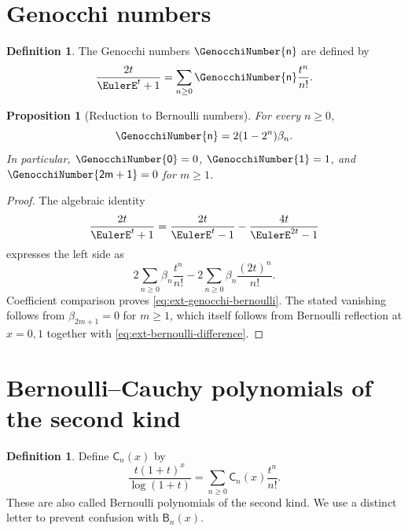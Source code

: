 \documentclass[11pt,a4paper,oneside,openany]{book}
\newtheorem{proposition}[theorem]{Proposition}
\theoremstyle{definition}
\newtheorem{definition}[theorem]{Definition}
\theoremstyle{remark}
\begin{document}
\section{Genocchi numbers}

\begin{definition}
The Genocchi numbers \(\mathsf \GenocchiNumber{n}\) are defined by
\begin{equation}\label{eq:ext-genocchi-egf}
 \frac{2t}{\EulerE^t+1}=\sum_{n\ge0}\mathsf \GenocchiNumber{n}\frac{t^n}{n!}.
\end{equation}
\end{definition}

\begin{proposition}[Reduction to Bernoulli numbers]
For every \(n\ge0\),
\begin{equation}\label{eq:ext-genocchi-bernoulli}
 \mathsf \GenocchiNumber{n}=2(1-2^n)\beta_n.
\end{equation}
In particular, \(\mathsf \GenocchiNumber{0}=0\), \(\mathsf \GenocchiNumber{1}=1\), and
\(\mathsf \GenocchiNumber{2m+1}=0\) for \(m\ge1\).
\end{proposition}
\begin{proof}
The algebraic identity
\[
 \frac{2t}{\EulerE^t+1}=\frac{2t}{\EulerE^t-1}-\frac{4t}{\EulerE^{2t}-1}
\]
expresses the left side as
\[
 2\sum_{n\ge0}\beta_n\frac{t^n}{n!}
 -2\sum_{n\ge0}\beta_n\frac{(2t)^n}{n!}.
\]
Coefficient comparison proves \eqref{eq:ext-genocchi-bernoulli}.  The stated
vanishing follows from \(\beta_{2m+1}=0\) for \(m\ge1\), which itself follows
from Bernoulli reflection at \(x=0,1\) together with
\eqref{eq:ext-bernoulli-difference}.
\end{proof}

\section{Bernoulli--Cauchy polynomials of the second kind}

\begin{definition}
Define \(\mathsf C_n(x)\) by
\begin{equation}\label{eq:ext-cauchy-poly-egf}
 \frac{t(1+t)^x}{\log(1+t)}
 =\sum_{n\ge0}\mathsf C_n(x)\frac{t^n}{n!}.
\end{equation}
These are also called Bernoulli polynomials of the second kind.  We use a
distinct letter to prevent confusion with \(\mathsf B_n(x)\).
\end{definition}
\end{document}

